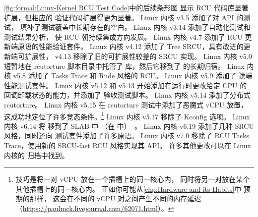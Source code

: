 \cref{fig:formal:Linux-Kernel RCU Test Code}中的后续条形图
显示 RCU 代码库显著扩展，但相应的
验证代码扩展得更为显著。
Linux 内核 v3.5 添加了对  API 的测试，
填补了测试覆盖中长期存在的空白。
Linux 内核 v3.14 添加了自动化测试和测试结果分析，
使 RCU 朝持续集成方向发展。
Linux 内核 v4.7 添加了 RCU 更新端原语的性能验证套件。
Linux 内核 v4.12 添加了 Tree SRCU，具有改进的更新端可扩展性，
v4.13 移除了旧的可扩展性较差的 SRCU 实现。
Linux 内核 v5.0 短暂地在 rcutorture 脚本目录中托管了
 库，然后它移到了 
的长期归宿。
Linux 内核 v5.8 添加了 Tasks Trace 和 Rude 风格的 RCU\@。
Linux 内核 v5.9 添加了  读端性能测试套件。
Linux 内核 v5.12 和 v5.13 开始添加在运行时更改给定 CPU 的
回调卸载状态的能力，并添加了  验收测试脚本。
Linux 内核 v5.14 添加了分布式 rcutorture。
Linux 内核 v5.15 在 rcutorture 测试中添加了恶魔式 vCPU 放置，
这成功地定位了许多竞态条件。\footnote{
	技巧是将一对 vCPU 放在一个插槽上的同一核心内，
	同时将另一对放在某个其他插槽上的同一核心内。
	正如你可能从\cref{chp:Hardware and its Habits}中
	预期的那样，
	这会在不同的 vCPU 对之间产生不同的内存延迟
	（\url{https://paulmck.livejournal.com/62071.html}）。}
Linux 内核 v5.17 移除了  Kconfig 选项。
Linux 内核 v6.14 将  移到了 SLAB 中
（在  中）~\cite{20241212180208.274813-1-urezki}。
Linux 内核 v6.19 添加了几种 SRCU 风格，同时还向 
测试套件添加了许多原语。
Linux 内核 v7.0 移除了 RCU Tasks Trace，使用新的 SRCU-fast
RCU 风格实现其 API。
许多其他更改可以在 Linux 内核的  归档中找到。

